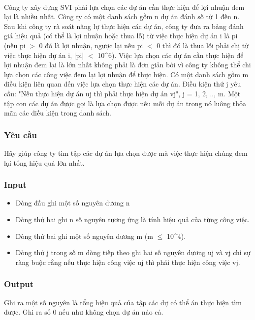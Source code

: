 

 

Công ty xây dựng SVI phải lựa chọn các dự án cần thực hiện để lợi nhuận đem lại là nhiều nhất. Công ty có một danh sách gồm n dự án đánh số từ 1 đến n. Sau khi công ty rà soát năng lự thực hiện các dự án, công ty đưa ra bảng đánh giá hiệu quả (có thể là lợi nhuận hoặc thua lỗ) từ việc thực hiện dự án i là pi (nếu pi $>$ 0 đó là lợi nhuận, ngược lại nếu pi $<$ 0 thì đó là thua lỗi phải chị từ việc thực hiện dự án i, |pi| $<$ 10\textasciicircum6). Việc lựa chọn các dự án cần thực hiện để lợi nhuận đem lại là lớn nhất không phải là đơn giản bời vì công ty không thể chi lựa chọn các công việc đem lại lợi nhuận để thực hiện. Có một danh sách gồm m điều kiện liên quan đến việc lựa chọn thực hiện các dự án. Điều kiện thứ j yêu cầu: "Nếu thực hiện dự án uj thì phải thực hiện dự án vj", j = 1, 2, .., m. Một tập con các dự án được gọi là lựa chọn được nếu mỗi dự án trong nó luông thỏa mãn các điều kiện trong danh sách.

\subsubsection{Yêu cầu}

Hãy giúp công ty tìm tập các dự án lựa chọn được mà việc thực hiện chúng đem lại tổng hiệu quả lớn nhất.

\subsubsection{Input}
\begin{itemize}
	\item Dòng đầu ghi một số nguyên dương n
	\item Dòng thứ hai ghi n số nguyên tương ứng là tính hiệu quả của từng công việc.
	\item Dòng thứ bai ghi một số nguyên dương m (m  $\le$  10\textasciicircum4).
	\item Dòng thứ j trong số m dòng tiếp theo ghi hai số nguyên dương uj và vj chỉ sự ràng buộc rằng nếu thực hiện công việc uj thì phải thực hiện công việc vj.
\end{itemize}

\subsubsection{Output}

Ghi ra một số nguyên là tổng hiệu quả của tập các dự có thể án thực hiện tìm được. Ghi ra số 0 nếu như không chọn dự án nảo cả.

